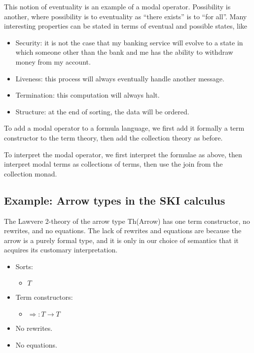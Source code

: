 \documentclass{article}
\newcommand{\maps}{\colon}
\newcommand{\lhom}{\Rightarrow}
\begin{document}
This notion of eventuality is an example of a modal operator.  Possibility is another, where possibility is to eventuality as ``there exists'' is to ``for all''.  Many interesting properties can be stated in terms of eventual and possible states, like
\begin{itemize}
  \item Security: it is not the case that my banking service will evolve to a state in which someone other than the bank and me has the ability to withdraw money from my account.
  \item Liveness: this process will always eventually handle another message.
  \item Termination: this computation will always halt.
  \item Structure: at the end of sorting, the data will be ordered.
\end{itemize}

To add a modal operator to a formula language, we first add it formally a term constructor to the term theory, then add the collection theory as before.  

To interpret the modal operator, we first interpret the formulae as above, then interpret modal terms as collections of terms, then use the join from the collection monad.

\subsection{Example: Arrow types in the SKI calculus}

The Lawvere 2-theory of the arrow type Th(Arrow) has one term constructor, no rewrites, and no equations.  The lack of rewrites and equations are because the arrow is a purely formal type, and it is only in our choice of semantics that it acquires its customary interpretation.
\begin{itemize}
  \item Sorts:
  \begin{itemize}
    \item $T$
  \end{itemize}
  \item Term constructors:
    \begin{itemize}
      \item $\lhom\maps T \to T$
    \end{itemize}
  \item No rewrites.
  \item No equations.
\end{itemize}
\end{document}
